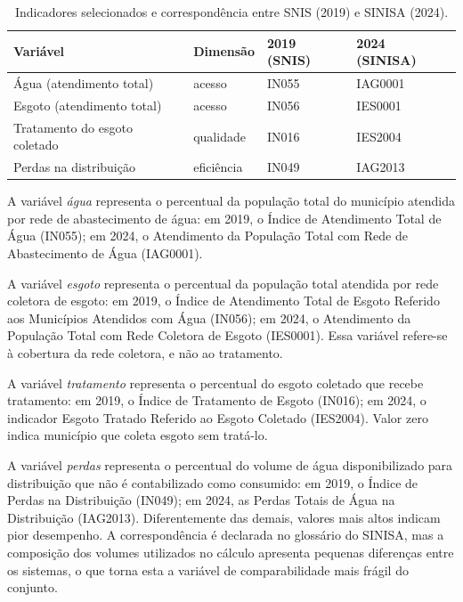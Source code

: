 \documentclass[12pt]{article}
\begin{document}
\begin{table}[ht]
\centering
\caption{Indicadores selecionados e correspondência entre SNIS (2019) e SINISA (2024).}
\label{tab:indicadores}
\small
\begin{tabular}{llll}
\toprule
Variável & Dimensão & 2019 (SNIS) & 2024 (SINISA) \\
\midrule
Água (atendimento total)        & acesso     & IN055 & IAG0001 \\
Esgoto (atendimento total)      & acesso     & IN056 & IES0001 \\
Tratamento do esgoto coletado   & qualidade  & IN016 & IES2004 \\
Perdas na distribuição          & eficiência & IN049 & IAG2013 \\
\bottomrule
\end{tabular}
\end{table}

A variável \emph{água} representa o percentual da população total do município atendida por rede
de abastecimento de água: em 2019, o Índice de Atendimento Total de Água (IN055); em 2024, o
Atendimento da População Total com Rede de Abastecimento de Água (IAG0001).

A variável \emph{esgoto} representa o percentual da população total atendida por rede coletora de
esgoto: em 2019, o Índice de Atendimento Total de Esgoto Referido aos Municípios Atendidos com Água
(IN056); em 2024, o Atendimento da População Total com Rede Coletora de Esgoto (IES0001). Essa
variável refere-se à cobertura da rede coletora, e não ao tratamento.

A variável \emph{tratamento} representa o percentual do esgoto coletado que recebe tratamento: em
2019, o Índice de Tratamento de Esgoto (IN016); em 2024, o indicador Esgoto Tratado Referido ao
Esgoto Coletado (IES2004). Valor zero indica município que coleta esgoto sem tratá-lo.

A variável \emph{perdas} representa o percentual do volume de água disponibilizado para distribuição
que não é contabilizado como consumido: em 2019, o Índice de Perdas na Distribuição (IN049); em
2024, as Perdas Totais de Água na Distribuição (IAG2013). Diferentemente das demais, valores mais
altos indicam pior desempenho. A correspondência é declarada no glossário do SINISA, mas a
composição dos volumes utilizados no cálculo apresenta pequenas diferenças entre os sistemas, o que
torna esta a variável de comparabilidade mais frágil do conjunto.
\end{document}
